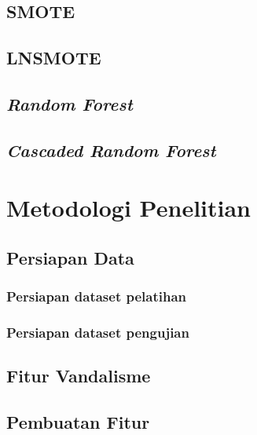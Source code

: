 \section{SMOTE}


\section{LNSMOTE}


\section{\textit{Random Forest}}


\section{\textit{Cascaded Random Forest}}



\chapter{Metodologi Penelitian}


\section{Persiapan Data}
\label{persiapan_data}


\subsection{Persiapan dataset pelatihan}


\subsection{Persiapan dataset pengujian}


\section{Fitur Vandalisme}


\section{Pembuatan Fitur}


